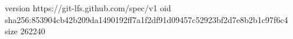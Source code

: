version https://git-lfs.github.com/spec/v1
oid sha256:853904cb42b209da1490192ff7a1f2df91d09457c52923bf2d7e8b2b1c97f6c4
size 262240
